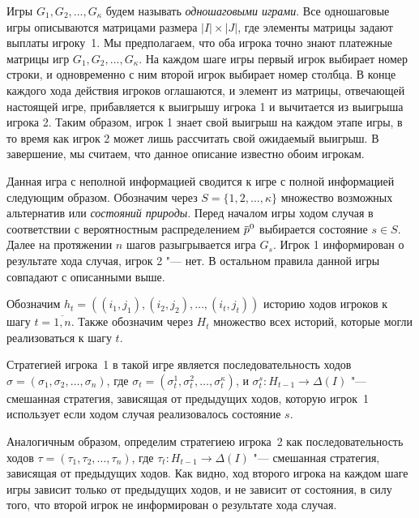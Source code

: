 Игры $G_1, G_2, \ldots, G_\kappa$ будем называть \emph{одношаговыми играми}. Все
одношаговые игры описываются матрицами размера $|I| \times |J|$, где элементы
матрицы задают выплаты игроку~1. Мы предполагаем, что оба игрока точно знают
платежные матрицы игр $G_1, G_2, \ldots, G_\kappa$. На каждом шаге игры первый
игрок выбирает номер строки, и одновременно с ним второй игрок выбирает номер
столбца. В конце каждого хода действия игроков оглашаются, и элемент из матрицы,
отвечающей настоящей игре, прибавляется к выигрышу игрока 1 и вычитается из
выигрыша игрока 2. Таким образом, игрок 1 знает свой выигрыш на каждом этапе
игры, в то время как игрок 2 может лишь рассчитать свой ожидаемый выигрыш. В
завершение, мы считаем, что данное описание известно обоим игрокам.

Данная игра с неполной информацией сводится к игре с полной информацией
следующим образом. Обозначим через $S = \{1, 2, \ldots, \kappa\}$ множество
возможных альтернатив или \emph{состояний природы}. Перед началом игры ходом
случая в соответствии с вероятностным распределением $\po$ выбирается состояние
$s \in S$. Далее на протяжении $n$ шагов разыгрывается игра $G_s$. Игрок 1
информирован о результате хода случая, игрок 2 "--- нет. В остальном правила
данной игры совпадают с описанными выше.

Обозначим %
$h_t = \left((i_1, j_1), (i_2, j_2), \ldots, (i_t, j_t)\right)$ %
историю ходов игроков к шагу $t = \overline{1, n}$. Также обозначим через $H_t$
множество всех историй, которые могли реализоваться к шагу $t$. 

Стратегией игрока~1 в такой игре является последовательность ходов %
$\sigma = (\sigma_1, \sigma_2, \ldots, \sigma_n)$, где %
$\sigma_t = (\sigma^1_t, \sigma^2_t, \ldots, \sigma^\kappa_t)$, и %
$\sigma^s_t: H_{t-1} \rightarrow \Delta(I)$ "--- смешанная стратегия, зависящая
от предыдущих ходов, которую игрок~1 использует если ходом случая реализовалось
состояние $s$.

Аналогичным образом, определим стратегиею игрока~2 как последовательность
ходов %
$\tau = (\tau_1, \tau_2, \ldots, \tau_n)$, где %
$\tau_t: H_{t-1} \rightarrow \Delta(I)$ "--- смешанная стратегия, зависящая от
предыдущих ходов. Как видно, ход второго игрока на каждом шаге игры зависит
только от предыдущих ходов, и не зависит от состояния, в силу того, что второй
игрок не информирован о результате хода случая.

